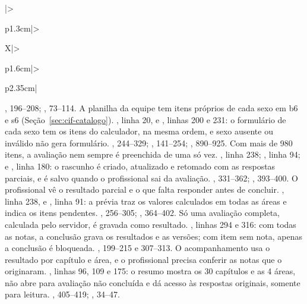 \begin{apendicesenv}
{\begin{xltabular}{\textwidth}{|>{\raggedright\arraybackslash}p{1.3cm}|>{\raggedright\arraybackslash}X|>{\raggedright\arraybackslash}p{1.6cm}|>{\raggedright\arraybackslash}p{2.35cm}|}
		{, 196--208; , 73--114.}
		{A planilha da equipe tem itens próprios de cada sexo em b6 e s6 (Seção~\ref{sec:cif-catalogo}).}
		{, linha 20, e , linhas 200 e 231: o formulário de cada sexo
		tem os itens do calculador, na mesma ordem, e sexo ausente ou inválido não gera formulário.}
		{, 244--329; , 141--254; , 890--925.}
		{Com mais de 980 itens, a avaliação nem sempre é preenchida de uma só vez.}
		{, linha 238; , linha 94; e
		, linha 180: o rascunho é criado, atualizado e retomado com as respostas
		parciais, e é salvo quando o profissional sai da avaliação.}
		{, 331--362; , 393--400.}
		{O profissional vê o resultado parcial e o que falta responder antes de concluir.}
		{, linha 238, e , linha 91: a prévia traz os valores
		calculados em todas as áreas e indica os itens pendentes.}
		{, 256--305; , 364--402.}
		{Só uma avaliação completa, calculada pelo servidor, é gravada como resultado.}
		{, linhas 294 e 316: com todas as notas, a conclusão grava os resultados e as versões;
		com item sem nota, apenas a conclusão é bloqueada.}
		{, 199--215 e 307--313.}
		{O acompanhamento usa o resultado por capítulo e área, e o profissional precisa conferir as notas que o
		originaram.}
		{, linhas 96, 109 e 175: o resumo mostra os 30 capítulos e as 4 áreas, não abre
		para avaliação não concluída e dá acesso às respostas originais, somente para leitura.}
		{, 405--419; , 34--47.}

\end{xltabular}}
\end{apendicesenv}
